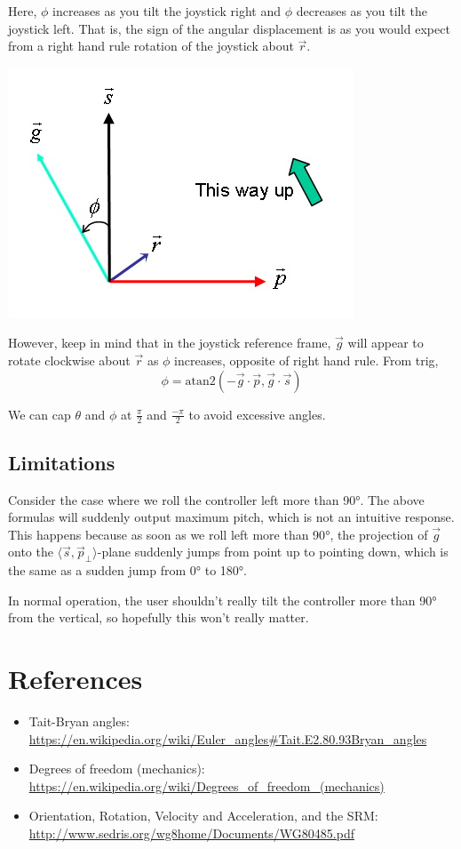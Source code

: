 \documentclass[12pt]{article}
\begin{document}
	Here, $\phi$ increases as you tilt the joystick right
	and $\phi$ decreases as you tilt the joystick left.
	That is, the sign of the angular displacement is as you would expect
	from a right hand rule rotation of the joystick about $\vec{r}$.
	\begin{center}\includegraphics{jroll.png}\end{center}
	However, keep in mind that in the joystick reference frame,
	$\vec{g}$ will appear to rotate clockwise about $\vec{r}$ as 
	$\phi$ increases, opposite of right hand rule. From trig,
		$$\phi = \text{atan2}(-\vec{g} \cdot \vec{p}, \vec{g} \cdot \vec{s})$$

	We can cap $\theta$ and $\phi$ at $\tfrac{\pi}{2}$ and $\tfrac{-\pi}{2}$ to avoid excessive angles.
	
	\subsection{Limitations}
	
	Consider the case where we roll the controller left more than 90$\si{\degree}$. 
	The above formulas will suddenly output maximum pitch, which is not an intuitive response.
	This happens because as soon as we roll left more than 90$\si{\degree}$, the projection of $\vec{g}$ onto the $\langle \vec{s}, \vec{p}_\perp \rangle$-plane suddenly jumps from point up to pointing down,
	which is the same as a sudden jump from 0$\si{\degree}$ to 180$\si{\degree}$.
	
	In normal operation, the user shouldn't really tilt the controller more than 90$\si{\degree}$ from the vertical, so hopefully this won't really matter.
		
	\section{References}

	
	\begin{itemize}
		\item Tait-Bryan angles: \url{https://en.wikipedia.org/wiki/Euler_angles#Tait.E2.80.93Bryan_angles}	
		\item Degrees of freedom (mechanics): \url{https://en.wikipedia.org/wiki/Degrees_of_freedom_(mechanics)}
		\item Orientation, Rotation, Velocity and Acceleration,
and the SRM: \url{http://www.sedris.org/wg8home/Documents/WG80485.pdf}
	\end{itemize}
\end{document}
